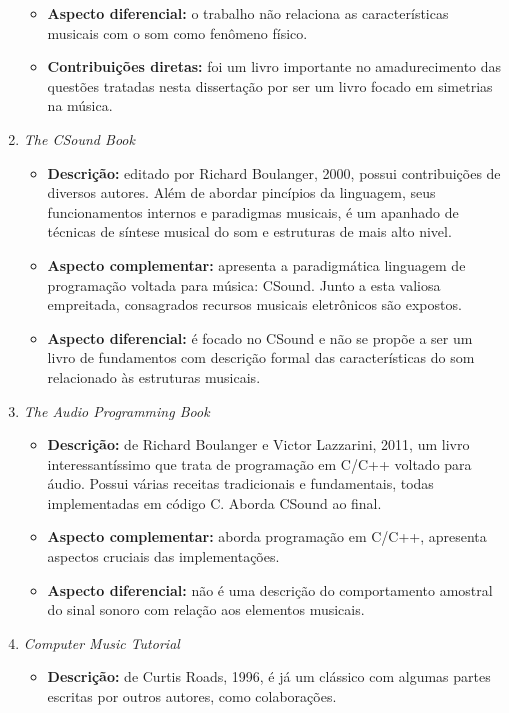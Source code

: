 \begin{enumerate}
\begin{itemize}
            \item {\bf Aspecto diferencial:} o trabalho não relaciona as características musicais com o som como fenômeno físico.
            \item {\bf Contribuições diretas:} foi um livro importante no amadurecimento das questões tratadas nesta dissertação por ser um livro focado em simetrias na música.
        \end{itemize}
    \item \emph{The CSound Book}
        \begin{itemize}
            \item {\bf Descrição:} editado por Richard Boulanger, 2000, possui contribuições de diversos autores. Além de abordar pincípios da linguagem, seus funcionamentos internos e paradigmas musicais, é um apanhado de técnicas de síntese musical do som e estruturas de mais alto nivel.
            \item {\bf Aspecto complementar:} apresenta a paradigmática linguagem de programação voltada para música: CSound. Junto a esta valiosa empreitada, consagrados recursos musicais eletrônicos são expostos.
            \item {\bf Aspecto diferencial:} é focado no CSound e não se propõe a ser um livro de fundamentos com descrição formal das características do som relacionado às estruturas musicais. 
        \end{itemize}
    \item \emph{The Audio Programming Book}
        \begin{itemize}
            \item {\bf Descrição:} de Richard Boulanger e Victor Lazzarini, 2011, um livro interessantíssimo que trata de programação em C/C++ voltado para áudio. Possui várias receitas tradicionais e fundamentais, todas implementadas em código C. Aborda CSound ao final. 
            \item {\bf Aspecto complementar:} aborda programação em C/C++, apresenta aspectos cruciais das implementações.
            \item {\bf Aspecto diferencial:} não é uma descrição do comportamento amostral do sinal sonoro com relação aos elementos musicais.
        \end{itemize}
    \item \emph{Computer Music Tutorial}
        \begin{itemize}
            \item {\bf Descrição:} de Curtis Roads, 1996, é já um clássico com algumas partes escritas por outros autores, como colaborações. 

\end{itemize}
\end{enumerate}

